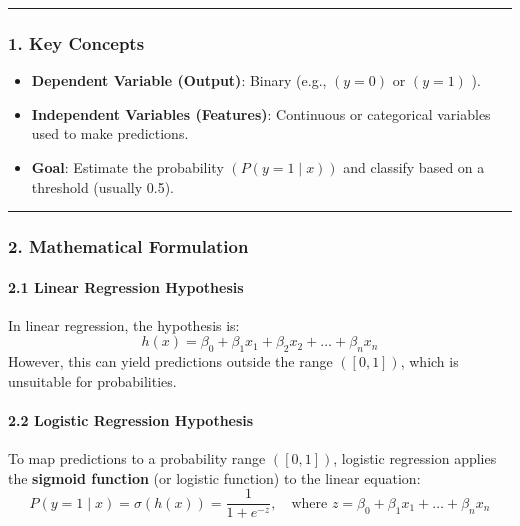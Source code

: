 \documentclass[12pt]{book}
\providecommand{\tightlist}{%
  \setlength{\itemsep}{0pt}\setlength{\parskip}{0pt}}
\begin{document}
\begin{center}\rule{0.5\linewidth}{0.5pt}\end{center}

\subsubsection{\texorpdfstring{1. \textbf{Key
Concepts}}{1. Key Concepts}}\label{key-concepts}

\begin{itemize}
\tightlist
\item
  \textbf{Dependent Variable (Output)}: Binary (e.g., \(( y = 0 )\) or
  \(( y = 1 )\) ).
\item
  \textbf{Independent Variables (Features)}: Continuous or categorical
  variables used to make predictions.
\item
  \textbf{Goal}: Estimate the probability \(( P(y=1 \mid x) )\) and
  classify based on a threshold (usually 0.5).
\end{itemize}

\begin{center}\rule{0.5\linewidth}{0.5pt}\end{center}

\subsubsection{\texorpdfstring{2. \textbf{Mathematical
Formulation}}{2. Mathematical Formulation}}\label{mathematical-formulation}

\paragraph{\texorpdfstring{2.1 \textbf{Linear Regression
Hypothesis}}{2.1 Linear Regression Hypothesis}}\label{linear-regression-hypothesis}

In linear regression, the hypothesis is: \[
h(x) = \beta_0 + \beta_1 x_1 + \beta_2 x_2 + \dots + \beta_n x_n
\] However, this can yield predictions outside the range \(([0, 1])\),
which is unsuitable for probabilities.

\paragraph{\texorpdfstring{2.2 \textbf{Logistic Regression
Hypothesis}}{2.2 Logistic Regression Hypothesis}}\label{logistic-regression-hypothesis}

To map predictions to a probability range \(([0, 1])\), logistic
regression applies the \textbf{sigmoid function} (or logistic function)
to the linear equation: \[
P(y=1 \mid x) = \sigma(h(x)) = \frac{1}{1 + e^{-z}}, \quad \text{where } z = \beta_0 + \beta_1 x_1 + \dots + \beta_n x_n
\]
\end{document}
